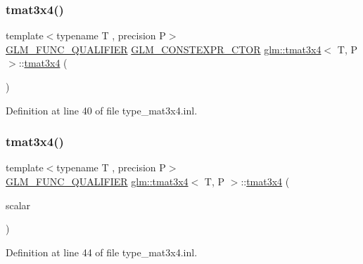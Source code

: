 \subsubsection{\texorpdfstring{tmat3x4()}{tmat3x4()}\hspace{0.1cm}{\footnotesize\ttfamily [4/22]}}
{\footnotesize\ttfamily template$<$typename T , precision P$>$ \\
\mbox{\hyperlink{setup_8hpp_a33fdea6f91c5f834105f7415e2a64407}{G\+L\+M\+\_\+\+F\+U\+N\+C\+\_\+\+Q\+U\+A\+L\+I\+F\+I\+ER}} \mbox{\hyperlink{setup_8hpp_ad34178a09666081abdb573c14d1f4a5a}{G\+L\+M\+\_\+\+C\+O\+N\+S\+T\+E\+X\+P\+R\+\_\+\+C\+T\+OR}} \mbox{\hyperlink{structglm_1_1tmat3x4}{glm\+::tmat3x4}}$<$ T, P $>$\+::\mbox{\hyperlink{structglm_1_1tmat3x4}{tmat3x4}} (\begin{DoxyParamCaption}\item[{\mbox{\hyperlink{namespaceglm_a807df837905ec286f806a536af03b57f}{ctor}}}]{ }\end{DoxyParamCaption})\hspace{0.3cm}{\ttfamily [explicit]}}



Definition at line 40 of file type\+\_\+mat3x4.\+inl.

\mbox{\label{structglm_1_1tmat3x4_a3a0ca2bde86e5e84185ae755d97f5f34}} 
\subsubsection{\texorpdfstring{tmat3x4()}{tmat3x4()}\hspace{0.1cm}{\footnotesize\ttfamily [5/22]}}
{\footnotesize\ttfamily template$<$typename T , precision P$>$ \\
\mbox{\hyperlink{setup_8hpp_a33fdea6f91c5f834105f7415e2a64407}{G\+L\+M\+\_\+\+F\+U\+N\+C\+\_\+\+Q\+U\+A\+L\+I\+F\+I\+ER}} \mbox{\hyperlink{structglm_1_1tmat3x4}{glm\+::tmat3x4}}$<$ T, P $>$\+::\mbox{\hyperlink{structglm_1_1tmat3x4}{tmat3x4}} (\begin{DoxyParamCaption}\item[{T}]{scalar }\end{DoxyParamCaption})\hspace{0.3cm}{\ttfamily [explicit]}}



Definition at line 44 of file type\+\_\+mat3x4.\+inl.

